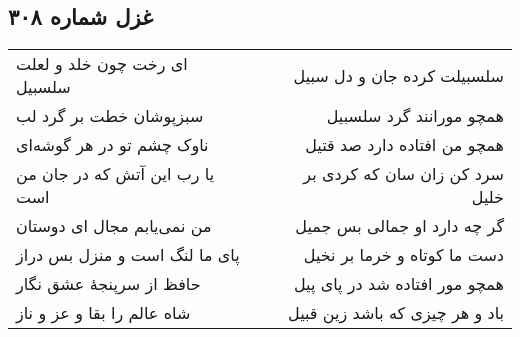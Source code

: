 \begin{center}
\section*{غزل شماره ۳۰۸}
\label{sec:sh308}
\begin{longtable}{l p{0.5cm} r}
ای رخت چون خلد و لعلت سلسبیل
&&
سلسبیلت کرده جان و دل سبیل
\\
سبزپوشان خطت بر گرد لب
&&
همچو مورانند گرد سلسبیل
\\
ناوک چشم تو در هر گوشه‌ای
&&
همچو من افتاده دارد صد قتیل
\\
یا رب این آتش که در جان من است
&&
سرد کن زان سان که کردی بر خلیل
\\
من نمی‌یابم مجال ای دوستان
&&
گر چه دارد او جمالی بس جمیل
\\
پای ما لنگ است و منزل بس دراز
&&
دست ما کوتاه و خرما بر نخیل
\\
حافظ از سرپنجهٔ عشق نگار
&&
همچو مور افتاده شد در پای پیل
\\
شاه عالم را بقا و عز و ناز
&&
باد و هر چیزی که باشد زین قبیل
\\
\end{longtable}
\end{center}
